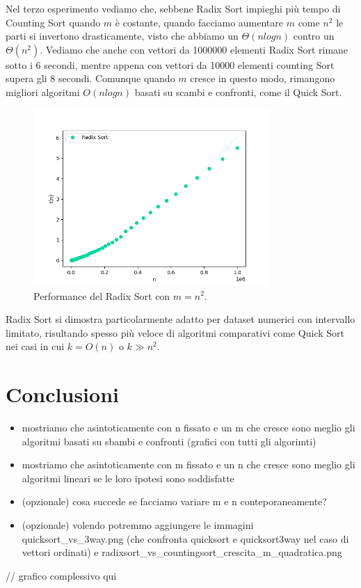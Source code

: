 \documentclass[a4paper, 12pt, oneside]{book}
\begin{document}
Nel terzo esperimento vediamo che, sebbene Radix Sort impieghi più tempo di Counting Sort quando \(m\) è costante, quando facciamo aumentare \(m\) come \(n^2\) le parti si invertono drasticamente, visto che abbiamo un \(\Theta(nlogn)\) contro un \(\Theta(n^2)\).
Vediamo che anche con vettori da 1000000 elementi Radix Sort rimane sotto i 6 secondi, mentre appena con vettori da 10000 elementi counting Sort supera gli 8 secondi. Comunque quando \(m\) cresce in questo modo, rimangono migliori algoritmi \(O(nlogn)\) basati su scambi e confronti, come il Quick Sort.

\begin{figure}[H]
    \centering
    \includegraphics[width=0.8\textwidth]{images/radixsort_nlogn.png}
    \caption{Performance del Radix Sort con \(m = n^2\).}
    \label{fig:radix_sort_3_way_m}
\end{figure}

\noindent Radix Sort si dimostra particolarmente adatto per dataset numerici con intervallo limitato, risultando spesso più veloce di algoritmi comparativi come Quick Sort nei casi in cui \(k = O(n)\) o \(k \gg n^2\).




\chapter{Conclusioni}\label{chap:Conclusioni} %

\begin{itemize}
    \item mostriamo che asintoticamente con n fissato e un m che cresce sono meglio gli algoritmi basati su sbambi e confronti (grafici con tutti gli algorimti)
    \item mostriamo che asintoticamente con m fissato e un n che cresce sono meglio gli algoritmi lineari se le loro ipotesi sono soddisfatte
    \item (opzionale) cosa succede se facciamo variare m e n conteporaneamente?
    \item (opzionale) volendo potremmo aggiungere le immagini quicksort_vs_3way.png (che confronta quicksort e quicksort3way nel caso di vettori ordinati) e radixsort_vs_countingsort_crescita_m_quadratica.png
\end{itemize}

// grafico complessivo qui

\end{document}
